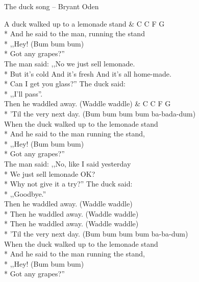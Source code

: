 \begin{piosenka_dluga}[-5mm]{The duck song -- Bryant Oden}

A duck walked up to a lemonade stand & C C F G \\*
And he said to the man, running the stand \\*
,,Hey! (Bum bum bum) \\*
Got any grapes?'' \\[\zwrotkaspace]

The man said: ,,No we just sell lemonade. \\*
But it’s cold And it's fresh And it’s all home-made. \\*
Can I get you glass?'' The duck said: \\*
,,I’ll pass''. \\[\zwrotkaspace]

 Then he waddled away. (Waddle waddle) & C C F G \\*
 'Til the very next day. (Bum bum bum bum ba-bada-dum) \\[\zwrotkaspace]

When the duck walked up to the lemonade stand \\*
And he said to the man running the stand, \\*
,,Hey! (Bum bum bum) \\*
Got any grapes?'' \\[\zwrotkaspace]

The man said: ,,No, like I said yesterday \\*
We just sell lemonade OK? \\*
Why not give it a try?'' The duck said: \\*
,,Goodbye.'' \\[\zwrotkaspace]

 Then he waddled away. (Waddle waddle) \\*
 Then he waddled away. (Waddle waddle) \\*
 Then he waddled away. (Waddle waddle) \\*
 'Til the very next day. (Bum bum bum bum ba-ba-dum) \\[\zwrotkaspace]

When the duck walked up to the lemonade stand \\*
And he said to the man running the stand, \\*
,,Hey! (Bum bum bum) \\*
Got any grapes?'' \\[\zwrotkaspace]


\end{piosenka_dluga}
